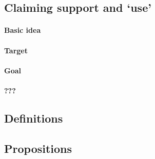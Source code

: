 \subsection{Claiming support and `use'}
\label{sec:claiming-support-use}

\paragraph{Basic idea}

\ideaUSE*

\paragraph*{Target}

\targetESU*

\paragraph*{Goal}

\goalEAS*

\thoughtEASw*


\hozline

\paragraph{???}

\ideaCSbyAR*

\ideaCSbyWR*

\subsection*{Definitions}









\subsection*{Propositions}

\propRecogniseDefeaters*


\propScenariosExist*

\propAbilityExuastive*

\propNoESUandADB*

\propLCS*

\propFCS*

